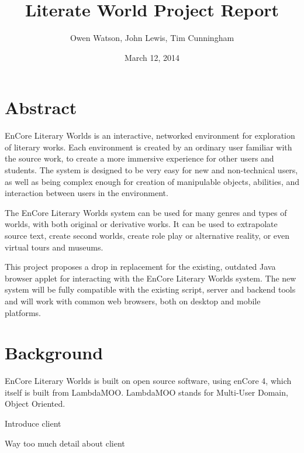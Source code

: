 \documentclass[12pt, letterpaper]{report}
\author{Owen Watson, John Lewis, Tim Cunningham}
\title{Literate World Project Report}
\date{March 12, 2014}
\begin{document}
	\begin{titlepage}
	\Huge \maketitle \par
	\end{titlepage}
	
	\chapter{Abstract}
	\par
	EnCore Literary Worlds is an interactive, networked environment for exploration of literary works. Each environment is created by an ordinary user familiar with the source work, to create a more immersive experience for other users and students. The system is designed to be very easy for new and non-technical users, as well as being complex enough for creation of manipulable objects, abilities, and interaction between users in the environment.
	
	\par
	The EnCore Literary Worlds system can be used for many genres and types of worlds, with both original or derivative works. It can be used to extrapolate source text, create second worlds, create role play or alternative reality, or even virtual tours and museums.
	
	\par
	This project proposes a drop in replacement for the existing, outdated Java browser applet for interacting with the EnCore Literary Worlds system. The new system will be fully compatible with the existing script, server and backend tools and will work with common web browsers, both on desktop and mobile platforms.
	
	\tableofcontents
	
	\chapter{Background}
	\par
	EnCore Literary Worlds is built on open source software, using enCore 4, which itself is built from LambdaMOO. LambdaMOO stands for Multi-User Domain, Object Oriented.
	
	\par
	Introduce client
	

	\par
	Way too much detail about client
\end{document}
